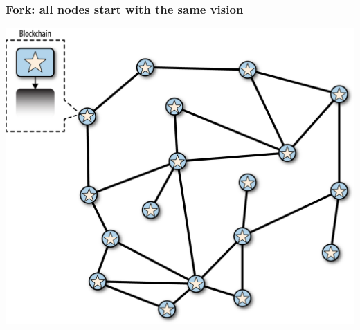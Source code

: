 \documentclass[11pt]{beamer}  %
\begin{document}
\begin{frame}\frametitle{Fork: all nodes start with the same vision}

  \begin{center}
    \includegraphics[scale=0.8,clip=false]{pictures/mbc2_1002.png}
  \end{center}

\end{frame}
\end{document}
